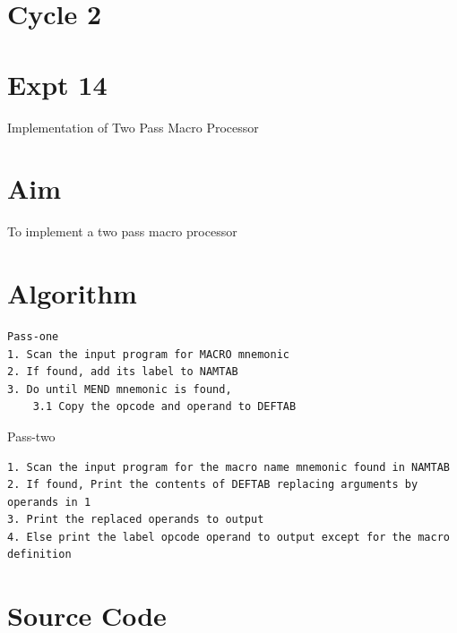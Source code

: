 \documentclass[13pt,oneside]{book}
\begin{document}
\section*{Cycle 2}
\section*{Expt 14}
\begin{center}
    \Large{Implementation of Two Pass Macro Processor}
\end{center}
\section*{Aim}
\large
To implement a two pass macro processor

\section*{Algorithm} 
    \begin{verbatim}
Pass-one
1. Scan the input program for MACRO mnemonic
2. If found, add its label to NAMTAB
3. Do until MEND mnemonic is found,
	3.1 Copy the opcode and operand to DEFTAB
	\end{verbatim}

Pass-two
\begin{verbatim}
1. Scan the input program for the macro name mnemonic found in NAMTAB
2. If found, Print the contents of DEFTAB replacing arguments by operands in 1
3. Print the replaced operands to output
4. Else print the label opcode operand to output except for the macro definition
\end{verbatim}

\section*{Source Code}
\small
\end{document}
